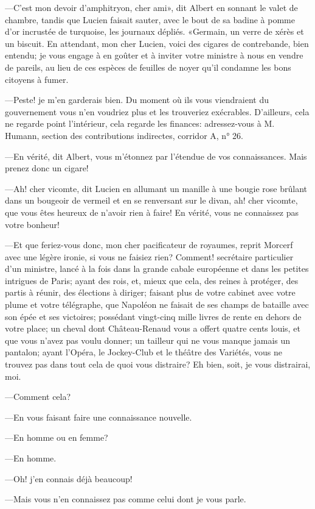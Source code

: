 —C'est mon devoir d'amphitryon, cher ami», dit Albert en sonnant le valet de chambre, tandis que Lucien faisait sauter, avec le bout de sa badine à pomme d'or incrustée de turquoise, les journaux dépliés. «Germain, un verre de xérès et un biscuit. En attendant, mon cher Lucien, voici des cigares de contrebande, bien entendu; je vous engage à en goûter et à inviter votre ministre à nous en vendre de pareils, au lieu de ces espèces de feuilles de noyer qu'il condamne les bons citoyens à fumer. 

—Peste! je m'en garderais bien. Du moment où ils vous viendraient du gouvernement vous n'en voudriez plus et les trouveriez exécrables. D'ailleurs, cela ne regarde point l'intérieur, cela regarde les finances: adressez-vous à M. Humann, section des contributions indirectes, corridor A, n° 26. 

—En vérité, dit Albert, vous m'étonnez par l'étendue de vos connaissances. Mais prenez donc un cigare! 

—Ah! cher vicomte, dit Lucien en allumant un manille à une bougie rose brûlant dans un bougeoir de vermeil et en se renversant sur le divan, ah! cher vicomte, que vous êtes heureux de n'avoir rien à faire! En vérité, vous ne connaissez pas votre bonheur! 

—Et que feriez-vous donc, mon cher pacificateur de royaumes, reprit Morcerf avec une légère ironie, si vous ne faisiez rien? Comment! secrétaire particulier d'un ministre, lancé à la fois dans la grande cabale européenne et dans les petites intrigues de Paris; ayant des rois, et, mieux que cela, des reines à protéger, des partis à réunir, des élections à diriger; faisant plus de votre cabinet avec votre plume et votre télégraphe, que Napoléon ne faisait de ses champs de bataille avec son épée et ses victoires; possédant vingt-cinq mille livres de rente en dehors de votre place; un cheval dont Château-Renaud vous a offert quatre cents louis, et que vous n'avez pas voulu donner; un tailleur qui ne vous manque jamais un pantalon; ayant l'Opéra, le Jockey-Club et le théâtre des Variétés, vous ne trouvez pas dans tout cela de quoi vous distraire? Eh bien, soit, je vous distrairai, moi. 

—Comment cela? 

—En vous faisant faire une connaissance nouvelle. 

—En homme ou en femme? 

—En homme. 

—Oh! j'en connais déjà beaucoup! 

—Mais vous n'en connaissez pas comme celui dont je vous parle. 

